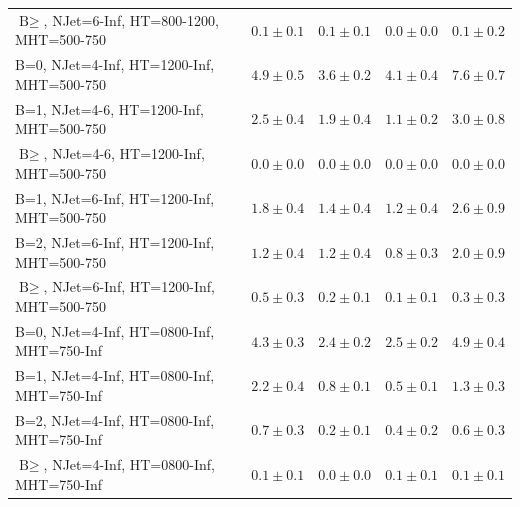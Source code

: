 \documentclass{beamer}
\begin{document}
\begin{frame}
\begin{tabular}{lrrrr}
   $\text{B}\geq$, NJet=6-Inf, HT=800-1200, MHT=500-750 &               $0.1\pm0.1$&               $0.1\pm0.1$&               $0.0\pm0.0$&                   $0.1\pm0.2$ \\ 
   B=0, NJet=4-Inf, HT=1200-Inf, MHT=500-750 &               $4.9\pm0.5$&               $3.6\pm0.2$&               $4.1\pm0.4$&                   $7.6\pm0.7$ \\ 
     B=1, NJet=4-6, HT=1200-Inf, MHT=500-750 &               $2.5\pm0.4$&               $1.9\pm0.4$&               $1.1\pm0.2$&                   $3.0\pm0.8$ \\ 
     $\text{B}\geq$, NJet=4-6, HT=1200-Inf, MHT=500-750 &               $0.0\pm0.0$&               $0.0\pm0.0$&               $0.0\pm0.0$&                   $0.0\pm0.0$ \\ 
   B=1, NJet=6-Inf, HT=1200-Inf, MHT=500-750 &               $1.8\pm0.4$&               $1.4\pm0.4$&               $1.2\pm0.4$&                   $2.6\pm0.9$ \\ 
   B=2, NJet=6-Inf, HT=1200-Inf, MHT=500-750 &               $1.2\pm0.4$&               $1.2\pm0.4$&               $0.8\pm0.3$&                   $2.0\pm0.9$ \\ 
   $\text{B}\geq$, NJet=6-Inf, HT=1200-Inf, MHT=500-750 &               $0.5\pm0.3$&               $0.2\pm0.1$&               $0.1\pm0.1$&                   $0.3\pm0.3$ \\ 
   B=0, NJet=4-Inf, HT=0800-Inf, MHT=750-Inf &               $4.3\pm0.3$&               $2.4\pm0.2$&               $2.5\pm0.2$&                   $4.9\pm0.4$ \\ 
   B=1, NJet=4-Inf, HT=0800-Inf, MHT=750-Inf &               $2.2\pm0.4$&               $0.8\pm0.1$&               $0.5\pm0.1$&                   $1.3\pm0.3$ \\ 
   B=2, NJet=4-Inf, HT=0800-Inf, MHT=750-Inf &               $0.7\pm0.3$&               $0.2\pm0.1$&               $0.4\pm0.2$&                   $0.6\pm0.3$ \\ 
   $\text{B}\geq$, NJet=4-Inf, HT=0800-Inf, MHT=750-Inf &               $0.1\pm0.1$&               $0.0\pm0.0$&               $0.1\pm0.1$&                   $0.1\pm0.1$ \\ 
\bottomrule 
\end{tabular}

\end{frame}
\end{document}
